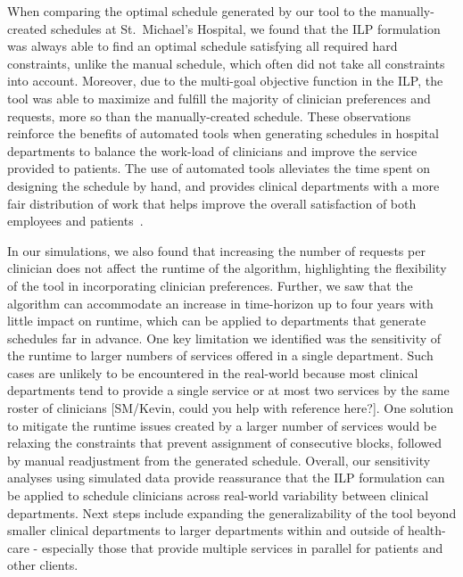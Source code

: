 When comparing the optimal schedule generated by our tool to the
manually-created schedules at St.\ Michael's Hospital, we found that the ILP
formulation was always able to find an optimal schedule satisfying all required
hard constraints, unlike the manual schedule, which often did not take all
constraints into account. Moreover, due to the multi-goal objective function in
the ILP, the tool was able to maximize and fulfill the majority of clinician
preferences and requests, more so than the manually-created schedule. These
observations reinforce the benefits of automated tools when generating schedules
in hospital departments to balance the work-load of clinicians and improve the
service provided to patients. The use of automated tools alleviates the time
spent on designing the schedule by hand, and provides clinical departments with
a more fair distribution of work that helps improve the overall satisfaction of
both employees and patients~\cite{silvestro_evaluation_2000}.  %

In our simulations, we also found that increasing the number of requests per
clinician does not affect the runtime of the algorithm, highlighting the
flexibility of the tool in incorporating clinician preferences. Further, we saw
that the algorithm can accommodate an increase in time-horizon up to four years
with little impact on runtime, which can be applied to departments that generate
schedules far in advance. One key limitation we identified was the sensitivity
of the runtime to larger numbers of services offered in a single department.
Such cases are unlikely to be encountered in the real-world because most
clinical departments tend to provide a single service or at most two services by
the same roster of clinicians [{\color{red}SM/Kevin, could you help with
	reference here?}]. One solution to mitigate the runtime issues created by a
larger number of services would be relaxing the constraints that prevent
assignment of consecutive blocks, followed by manual readjustment from the
generated schedule. %
Overall, our sensitivity analyses using simulated data provide reassurance that
the ILP formulation can be applied to schedule clinicians across real-world
variability between clinical departments. %
Next steps include expanding the generalizability of the tool beyond smaller
clinical departments to larger departments within and outside of health-care -
especially those that provide multiple services in parallel for patients and
other clients. 
